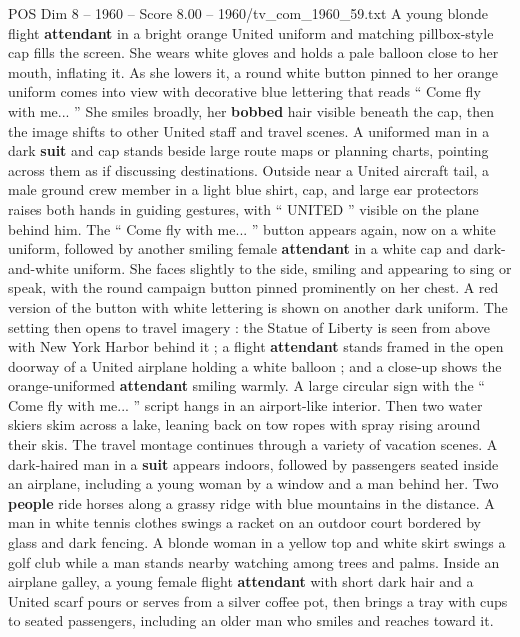 \begin{textsample}{POS Dim 8 – 1960 – Score 8.00 – 1960/tv\_com\_1960\_59.txt}  \label{ex:f8_pos_081}
A young blonde flight \textbf{attendant} in a bright orange United uniform and matching pillbox-style cap fills the screen.
She wears white gloves and holds a pale balloon close to her mouth, inflating it.
As she lowers it, a round white button pinned to her orange uniform comes into view with decorative blue lettering that reads “ Come fly with me... ” She smiles broadly, her \textbf{bobbed} hair visible beneath the cap, then the image shifts to other United staff and travel scenes.
A uniformed man in a dark \textbf{suit} and cap stands beside large route maps or planning charts, pointing across them as if discussing destinations.
Outside near a United aircraft tail, a male ground crew member in a light blue shirt, cap, and large ear protectors raises both hands in guiding gestures, with “ UNITED ” visible on the plane behind him.
The “ Come fly with me... ” button appears again, now on a white uniform, followed by another smiling female \textbf{attendant} in a white cap and dark-and-white uniform.
She faces slightly to the side, smiling and appearing to sing or speak, with the round campaign button pinned prominently on her chest.
A red version of the button with white lettering is shown on another dark uniform.
The setting then opens to travel imagery : the Statue of Liberty is seen from above with New York Harbor behind it ; a flight \textbf{attendant} stands framed in the open doorway of a United airplane holding a white balloon ; and a close-up shows the orange-uniformed \textbf{attendant} smiling warmly.
A large circular sign with the “ Come fly with me... ” script hangs in an airport-like interior.
Then two water skiers skim across a lake, leaning back on tow ropes with spray rising around their skis.
The travel montage continues through a variety of vacation scenes.
A dark-haired man in a \textbf{suit} appears indoors, followed by passengers seated inside an airplane, including a young woman by a window and a man behind her.
Two \textbf{people} ride horses along a grassy ridge with blue mountains in the distance.
A man in white tennis clothes swings a racket on an outdoor court bordered by glass and dark fencing.
A blonde woman in a yellow top and white skirt swings a golf club while a man stands nearby watching among trees and palms.
Inside an airplane galley, a young female flight \textbf{attendant} with short dark hair and a United scarf pours or serves from a silver coffee pot, then brings a tray with cups to seated passengers, including an older man who smiles and reaches toward it.

\end{textsample}
